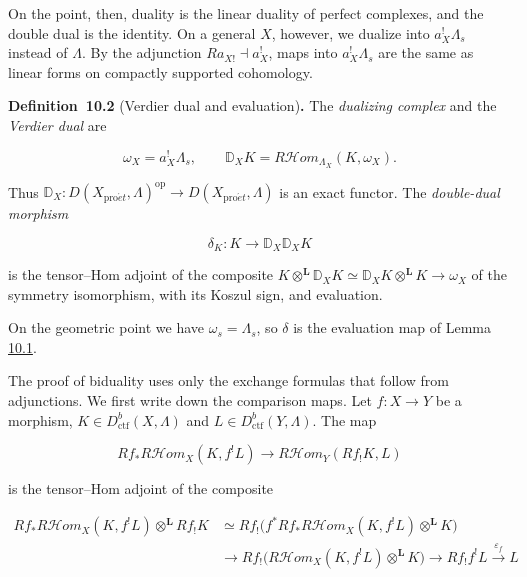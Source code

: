 \documentclass[11pt]{article}
\newenvironment{bpstatement}[2]{\par\addvspace{0.6\baselineskip}\noindent\textbf{#1}#2\textbf{.}\enspace\ignorespaces}
  {\par\addvspace{0.4\baselineskip}}
\providecommand{\cHom}{}\renewcommand{\cHom}{R\mathcal{H}\!om}
\begin{document}
\label{bp7}%
On the point, then, duality is the linear duality of perfect complexes, and the double dual is the identity. On a general \(X\), however, we dualize into \(a_X^!\Lambda_s\) instead of \(\Lambda\). By the adjunction \(Ra_{X!}\dashv a_X^!\), maps into \(a_X^!\Lambda_s\) are the same as linear forms on compactly supported cohomology.

\label{bp8}%
\begin{bpstatement}{Definition~10.2}{ (Verdier dual and evaluation)}
The \emph{dualizing complex} and the \emph{Verdier dual} are

\[
\omega_X=a_X^!\Lambda_s,\qquad
\mathbb D_XK=\cHom_{\Lambda_X}(K,\omega_X).
\]

Thus \(\mathbb D_X:D(X_{\mathrm{pro}\acute{e}t},\Lambda)^{\mathrm{op}}\to
D(X_{\mathrm{pro}\acute{e}t},\Lambda)\) is an exact functor. The \emph{double-dual morphism}

\[
\delta_K:K\longrightarrow\mathbb D_X\mathbb D_XK
\]

is the tensor–Hom adjoint of the composite \(K\otimes^{\mathbf L}\mathbb D_XK\simeq\mathbb D_XK\otimes^{\mathbf L}K
\to\omega_X\) of the symmetry isomorphism, with its Koszul sign, and evaluation.
\end{bpstatement}

\label{bp9}%
On the geometric point we have \(\omega_s=\Lambda_s\), so \(\delta\) is the evaluation map of Lemma \hyperref[bp5]{10.1}.

The proof of biduality uses only the exchange formulas that follow from adjunctions. We first write down the comparison maps. Let \(f:X\to Y\) be a morphism, \(K\in D^b_{\mathrm{ctf}}(X,\Lambda)\) and \(L\in D^b_{\mathrm{ctf}}(Y,\Lambda)\). The map

\[
Rf_*\cHom_X(K,f^!L)\longrightarrow\cHom_Y(Rf_!K,L)
\tag{10.1}
\]

is the tensor–Hom adjoint of the composite

\[
\begin{aligned}
Rf_*\cHom_X(K,f^!L)\otimes^{\mathbf L}Rf_!K
&\simeq Rf_!\bigl(f^*Rf_*\cHom_X(K,f^!L)\otimes^{\mathbf L}K\bigr)\\
&\longrightarrow Rf_!\bigl(\cHom_X(K,f^!L)\otimes^{\mathbf L}K\bigr)
\longrightarrow Rf_!f^!L\xrightarrow{\varepsilon_f}L
\end{aligned}
\]
\end{document}

